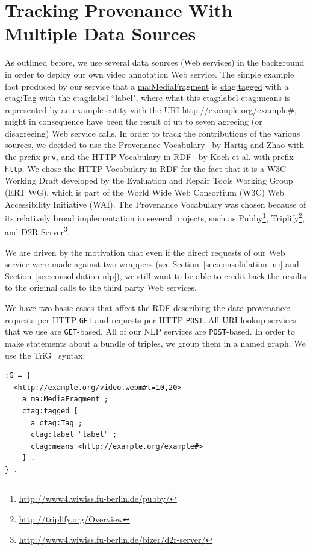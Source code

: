\documentclass[conference]{IEEEtran}
\begin{document}

\section{Tracking Provenance With Multiple Data Sources}                    \label{sec:tracking}
As outlined before, we use several data sources (Web services) in the background in order to deploy our own video annotation Web service.
The simple example fact produced by our service that a \url{ma:MediaFragment} is \url{ctag:tagged} with a \url{ctag:Tag}
with the \url{ctag:label} ``\url{label}", where what this \url{ctag:label} \url{ctag:means} is
represented by an example entity with the URI \url{http://example.org/example#}, might in consequence have been the
result of up to seven agreeing (or disagreeing) Web service calls. In order to track the contributions of the various
sources, we decided to use the Provenance Vocabulary~\cite{Hartig:Provenance} by Hartig and Zhao with the prefix \texttt{prv}, and the HTTP Vocabulary in RDF~\cite{HTTP:RDF} by Koch et al. with prefix \texttt{http}. We chose the HTTP Vocabulary in RDF for the fact that it is a W3C Working Draft  developed by the Evaluation and Repair Tools Working Group (ERT WG), which is part of the World Wide Web Consortium (W3C) Web Accessibility Initiative (WAI). The Provenance Vocabulary was chosen because of its relatively broad implementation in several projects, such as Pubby\footnote{\url{http://www4.wiwiss.fu-berlin.de/pubby/}}, Triplify\footnote{\url{http://triplify.org/Overview}}, and D2R Server\footnote{\url{http://www4.wiwiss.fu-berlin.de/bizer/d2r-server/}}.

We are driven by the motivation that even if the direct
requests of our Web service were made against two wrappers (see Section~\ref{sec:consolidation-uri} and
Section~\ref{sec:consolidation-nlp}), we still want to be able to credit back the results to the original calls to the third party
Web services.

We have two basic cases that affect the RDF describing the data provenance: requests per HTTP \texttt{GET} and requests
per HTTP \texttt{POST}. All URI lookup services that we use are \texttt{GET}-based. All of our NLP services are
\texttt{POST}-based. In order to make statements about a bundle of triples, we group them in a named graph. We use the
TriG~\cite{Bizer:TriG} syntax:
\begin{lstlisting}
:G = {
  <http://example.org/video.webm#t=10,20>
    a ma:MediaFragment ;
    ctag:tagged [
      a ctag:Tag ;
      ctag:label "label" ;
      ctag:means <http://example.org/example#>
    ] .
} .
\end{lstlisting}
\end{document}
